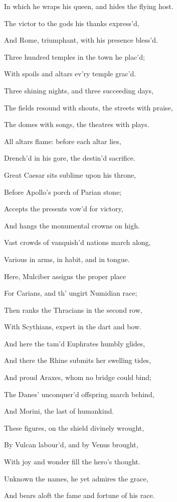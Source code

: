 In which he wraps his queen, and hides the flying host.

The victor to the gods his thanks express’d,

And Rome, triumphant, with his presence bless’d.

Three hundred temples in the town he plac’d;

With spoils and altars ev’ry temple grac’d.

Three shining nights, and three succeeding days,

The fields resound with shouts, the streets with praise,

The domes with songs, the theatres with plays.

All altars flame: before each altar lies,

Drench’d in his gore, the destin’d sacrifice.

Great Caesar sits sublime upon his throne,

Before Apollo’s porch of Parian stone;

Accepts the presents vow’d for victory,

And hangs the monumental crowns on high.

Vast crowds of vanquish’d nations march along,

Various in arms, in habit, and in tongue.

Here, Mulciber assigns the proper place

For Carians, and th’ ungirt Numidian race;

Then ranks the Thracians in the second row,

With Scythians, expert in the dart and bow.

And here the tam’d Euphrates humbly glides,

And there the Rhine submits her swelling tides,

And proud Araxes, whom no bridge could bind;

The Danes’ unconquer’d offspring march behind,

And Morini, the last of humankind.

These figures, on the shield divinely wrought,

By Vulcan labour’d, and by Venus brought,

With joy and wonder fill the hero’s thought.

Unknown the names, he yet admires the grace,

And bears aloft the fame and fortune of his race.


